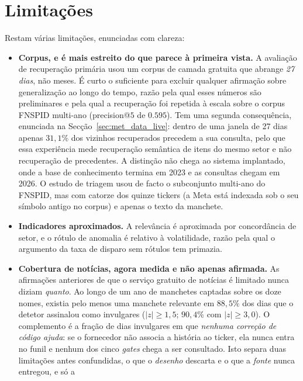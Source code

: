 \section{Limitações}
\label{sec:concl_limitations}

Restam várias limitações, enunciadas com clareza:
\begin{itemize}
  \item \textbf{Corpus, e é mais estreito do que parece à primeira vista.} A avaliação de recuperação
        primária usou um corpus de camada gratuita que abrange \emph{27 dias}, não meses. É curto o
        suficiente para excluir qualquer afirmação sobre generalização ao longo do tempo, razão pela
        qual esses números são preliminares e pela qual a recuperação foi repetida à escala sobre o
        corpus FNSPID multi-ano (precision@$5$ de $0.595$). Tem uma segunda consequência, enunciada
        na Secção~\ref{sec:met_data_live}: dentro de uma janela de 27 dias apenas $31,1\%$ dos
        vizinhos recuperados precedem a sua consulta, pelo que essa experiência mede recuperação
        semântica de itens do mesmo setor e não recuperação de precedentes. A distinção não chega ao
        sistema implantado, onde a base de conhecimento termina em 2023 e as consultas chegam em
        2026. O estudo de triagem usou de facto o subconjunto
        multi-ano do FNSPID, mas com catorze dos quinze tickers (a Meta está indexada sob o seu
        símbolo antigo no corpus) e apenas o texto da manchete.
  \item \textbf{Indicadores aproximados.} A relevância é aproximada por concordância de setor, e o
        rótulo de anomalia é relativo à volatilidade, razão pela qual o argumento da taxa de disparo
        sem rótulos tem primazia.
  \item \textbf{Cobertura de notícias, agora medida e não apenas afirmada.} As afirmações anteriores
        de que o serviço gratuito de notícias é limitado nunca diziam \emph{quanto}. Ao longo de um
        ano de manchetes captadas sobre os doze nomes, existia pelo menos uma manchete relevante em
        $88{,}5\%$ dos dias que o detetor assinalou como invulgares ($|z|\ge1{,}5$; $90{,}4\%$ com
        $|z|\ge3{,}0$). O complemento é a fração de dias invulgares em que \emph{nenhuma correção de
        código ajuda}: se o fornecedor não associa a história ao ticker, ela nunca entra no funil e
        nenhum dos cinco \emph{gates} chega a ser consultado. Isto separa duas limitações antes
        confundidas, o que o \emph{desenho} descarta e o que a \emph{fonte} nunca entregou, e só a

\end{itemize}
